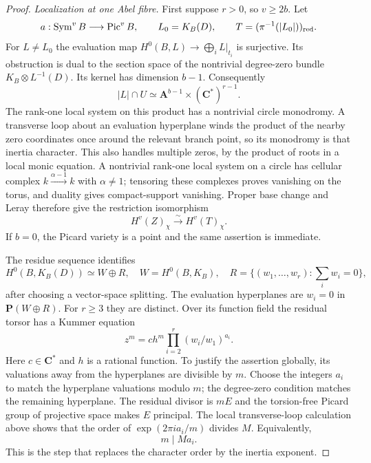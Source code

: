 \begin{proof}
\emph{Localization at one Abel fibre.}
First suppose $r>0$, so $v\ge2b$.  Let
\[
 a:\operatorname{Sym}^v B\longrightarrow\operatorname{Pic}^v B,
 \qquad L_0=K_B(D),\qquad
 T=(\pi^{-1}(|L_0|))_{\rm red}.
\]
For $L\ne L_0$ the evaluation map
$H^0(B,L)\to\bigoplus_i L|_{t_i}$ is surjective.  Its obstruction
is dual to the section space of the nontrivial degree-zero bundle
$K_B\otimes L^{-1}(D)$.  Its kernel has dimension $b-1$.
Consequently
\[
                |L|\cap U\simeq\mathbf A^{b-1}\times
                                      (\mathbf C^*)^{r-1}.
\]
The rank-one local system on this product has a nontrivial circle
monodromy.  A transverse loop about an evaluation hyperplane winds
the product of the nearby zero coordinates once around the relevant
branch point, so its monodromy is that inertia character.  This also
handles multiple zeros, by the product of roots in a local monic
equation.  A nontrivial rank-one local system on a circle has cellular
complex $k\xrightarrow{\alpha-1}k$ with $\alpha\ne1$; tensoring
these complexes proves vanishing on the torus, and duality gives
compact-support vanishing.  Proper base change and Leray therefore
give the restriction isomorphism
\[
                    H^v(Z)_\chi\xrightarrow{\sim}H^v(T)_\chi.
\tag{FS.1}
\]
If $b=0$, the Picard variety is a point and the same assertion is
immediate.

The residue sequence identifies
\[
 H^0(B,K_B(D))\simeq W\oplus R,
 \quad W=H^0(B,K_B),\quad
 R=\{(w_1,\ldots,w_r):\textstyle\sum_iw_i=0\},
\]
after choosing a vector-space splitting.  The evaluation hyperplanes
are $w_i=0$ in $\mathbf P(W\oplus R)$.  For $r\ge3$ they are
distinct.  Over its function field the residual torsor has a Kummer
equation
\[
                    z^m=c h^m\prod_{i=2}^r(w_i/w_1)^{a_i}.
\tag{FS.2}
\]
Here $c\in\mathbf C^*$ and $h$ is a rational function.  To justify
the assertion globally, its valuations away from the hyperplanes
are divisible by $m$.  Choose the integers $a_i$ to match the
hyperplane valuations modulo $m$; the degree-zero condition matches
the remaining hyperplane.  The residual divisor is $mE$ and the
torsion-free Picard group of projective space makes $E$ principal.
The local transverse-loop calculation above shows that the order
of $\exp(2\pi i a_i/m)$ divides $M$.  Equivalently,
\[
                             m\mid Ma_i.
\tag{FS.3}
\]
This is the step that replaces the character order by the inertia
exponent.


\end{proof}
